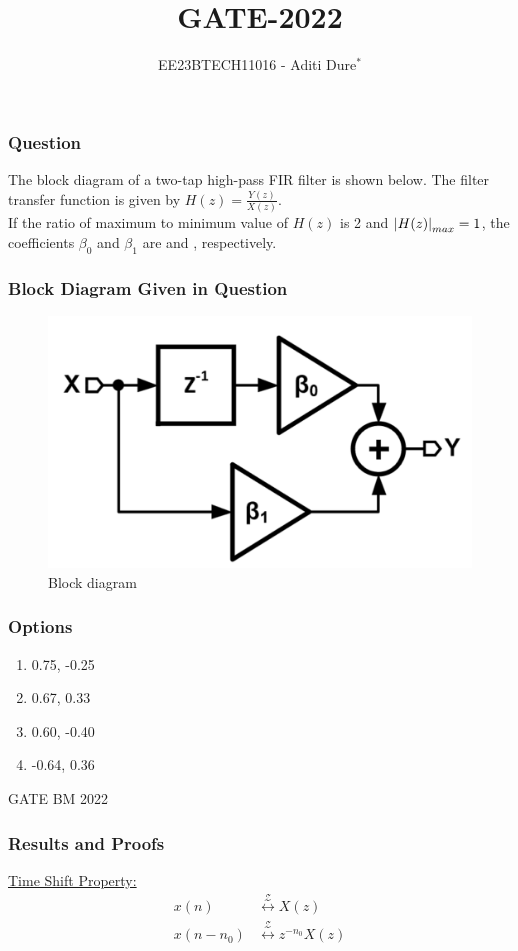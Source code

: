 \documentclass{beamer}
\begin{document}
\title{GATE-2022}
\author{EE23BTECH11016 - Aditi Dure$^{*}$}
\date{}
\frame{\titlepage}

\begin{frame}
\frametitle{Question}
The block diagram of a two-tap high-pass FIR filter is shown below. The filter transfer function is given by $H(z) = \frac{Y(z)}{X(z)}$.\\
If the ratio of maximum to minimum value of $H(z)$ is 2 and $\left\vert H(z)\right\vert_{max} = 1$, the coefficients $\beta_0$ and $\beta_1$ are \underline{\hspace{3cm}} and \underline{\hspace{3cm}}, respectively. 

\end{frame}

\begin{frame}
\frametitle{Block Diagram Given in Question}
\begin{figure}[H]
    \centering
    \includegraphics[width=0.5\linewidth]{figs/qfig.png} 
    \caption{Block diagram}
    \label{fig:GATE22BM39.1}
\end{figure}
\end{frame}

\begin{frame}
\frametitle{Options}
\begin{enumerate}
\item 0.75, -0.25
\item 0.67, 0.33
\item 0.60, -0.40
\item -0.64, 0.36
\end{enumerate}
\hfill{GATE BM 2022}
\end{frame}

\begin{frame}
\frametitle{Results and Proofs}
\underline{Time Shift Property:}
\begin{align}
x(n) &\overset{\mathcal{Z}}{\longleftrightarrow} X(z) \\
x(n-n_0) &\overset{\mathcal{Z}}{\longleftrightarrow} z^{-n_0}X(z) 
\end{align}
\end{frame}
\end{document}
